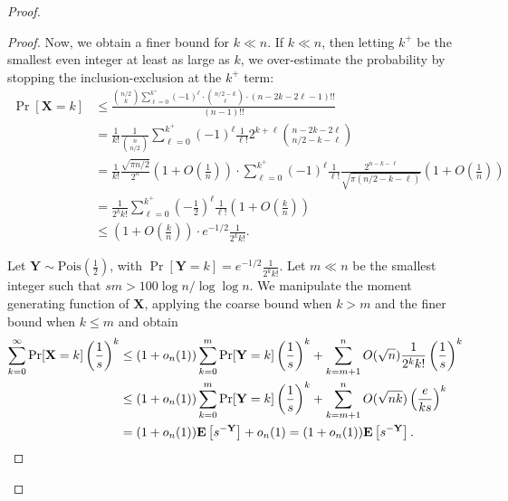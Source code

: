 \documentclass[10pt,a4paper]{amsart}
\newcommand{\bX}{\mathbf{X}}
\newcommand{\bY}{\mathbf{Y}}
\newcommand{\e}{{\mathbf E}}
\begin{document}
\begin{proof}
\begin{proof}
Now, we obtain a finer bound for $k\ll n$.
If $k \ll n$, then letting $k^+$ be the smallest even integer at least as large as $k$, we over-estimate the probability by stopping the inclusion-exclusion at the $k^+$ term:
\begin{align*}
\Pr[\bX = k]
&\le \frac{\binom{n/2}{k}\sum_{\ell=0}^{k^+} (-1)^\ell \cdot\binom{n/2 - k}{\ell} \cdot (n-2k - 2\ell-1)!!}{(n-1)!!}\\
&= \frac{1}{k!} \frac{1}{\binom{n}{n/2}} \sum_{\ell=0}^{k^+} (-1)^\ell \frac{1}{\ell!} 2^{k+\ell} \binom{n-2k-2\ell}{n/2-k-\ell}\\
&= \frac{1}{k!} \frac{\sqrt{\pi n/2}}{2^{n}}\left(1+O(\tfrac{1}{n})\right) \cdot \sum_{\ell=0}^{k^+} (-1)^\ell \frac{1}{\ell!} \frac{2^{n-k-\ell}}{\sqrt{\pi(n/2-k-\ell)}}\left(1+O(\tfrac{1}{n})\right)\\
&= \frac{1}{2^k k!} \sum_{\ell=0}^{k^+} \left(-\frac{1}{2}\right)^\ell \frac{1}{\ell!}\left(1+O(\tfrac{k}{n})\right)\\
&\leq \left(1 + O(\tfrac{k}{n})\right) \cdot e^{-1/2} \frac{1}{2^k k!}.
\end{align*}

Let $\bY \sim \mathrm{Pois}(\frac{1}{2})$, with $\Pr[\bY = k] = e^{-1/2} \frac{1}{2^k k!}$.
Let $m \ll n$ be the smallest integer such that $s m > 100 \log n / \log\log n$.
We manipulate the moment generating function of $\bX$, applying the coarse bound when $k > m$ and the finer bound when $k \le m$ and obtain
\begin{align*}
    \sum_{k=0}^\infty \Pr[\bX = k] \left(\frac{1}{s}\right)^k
    &\le (1+o_n(1))\sum_{k=0}^{m} \Pr[\bY = k] \left(\frac{1}{s}\right)^k + \sum_{k=m+1}^n O(\sqrt{n})\frac{1}{2^k k!} \left(\frac{1}{s}\right)^k\\
    &\le (1+o_n(1))\sum_{k=0}^{m} \Pr[\bY = k] \left(\frac{1}{s}\right)^k + \sum_{k=m+1}^n  O(\sqrt{n k})\left(\frac{e}{k s}\right)^k\\
    &= (1+o_n(1)) \e\left[s^{-\bY}\right] + o_n(1)
    = (1+o_n(1))\e\left[s^{-\bY}\right]. \qedhere
\end{align*}
\end{proof}



\end{proof}
\end{document}
